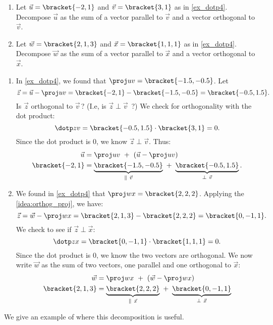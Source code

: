 \begin{example}\label{ex_dotp5}
\begin{enumerate}
	\item Let $\vec u =\bracket{-2,1}$ and $\vec v =\bracket{3,1}$ as in \autoref{ex_dotp4}. Decompose $\vec u$ as the sum of a vector parallel to $\vec v$ and a vector orthogonal to $\vec v$.
	\item	Let $\vec w =\bracket{2,1,3}$ and $\vec x  =\bracket{1,1,1}$ as in \autoref{ex_dotp4}. Decompose $\vec w$ as the sum of a vector parallel to $\vec x$ and a vector orthogonal to $\vec x$.
\end{enumerate}
\solution
\begin{enumerate}
	\item In \autoref{ex_dotp4}, we found that $\proj uv =\bracket{-1.5,-0.5}$. Let
	\[\vec z = \vec u - \proj uv =\bracket{-2,1}-\bracket{-1.5,-0.5}=\bracket{-0.5, 1.5}.\]
	Is $\vec z$ orthogonal to $\vec v$\,? (I.e, is $\vec z \perp\vec v$\ ?) We check for orthogonality with the dot product:
	\[\dotp zv =\bracket{-0.5,1.5}\cdot\bracket{3,1}=0.\]
	Since the dot product is 0, we know $\vec z \perp \vec v$. Thus:
	\begin{align*}
	\vec u &= \proj uv\ +\ (\vec u - \proj uv) \\
	\bracket{-2,1}&= \underbrace{\bracket{-1.5,-0.5}}_{\parallel\ \vec v}\ +\ \underbrace{\bracket{-0.5,1.5}}_{\perp \ \vec v}.
	\end{align*}
	
	\item	We found in \autoref{ex_dotp4} that $\proj wx =\bracket{2,2,2}$. Applying the \autoref{idea:orthog_proj}, we have:
	\[\vec z = \vec w - \proj wx =\bracket{2,1,3}-\bracket{2,2,2}=\bracket{0,-1,1}.\] We check to see if $\vec z \perp \vec x$:
	\[\dotp zx =\bracket{0,-1,1}\cdot\bracket{1,1,1}= 0.\]
	Since the dot product is 0, we know the two vectors are orthogonal.
	We now write $\vec w$ as the sum of two vectors, one parallel and one orthogonal to $\vec x$:
	\begin{align*}
	\vec w &= \proj wx\ +\ (\vec w - \proj wx) \\
	\bracket{2,1,3}&= \underbrace{\bracket{2,2,2}}_{\parallel\ \vec x}\ +\ \underbrace{\bracket{0,-1,1}}_{\perp \ \vec x}
	\end{align*}
\end{enumerate}
\end{example}

We give an example of where this decomposition is useful.

